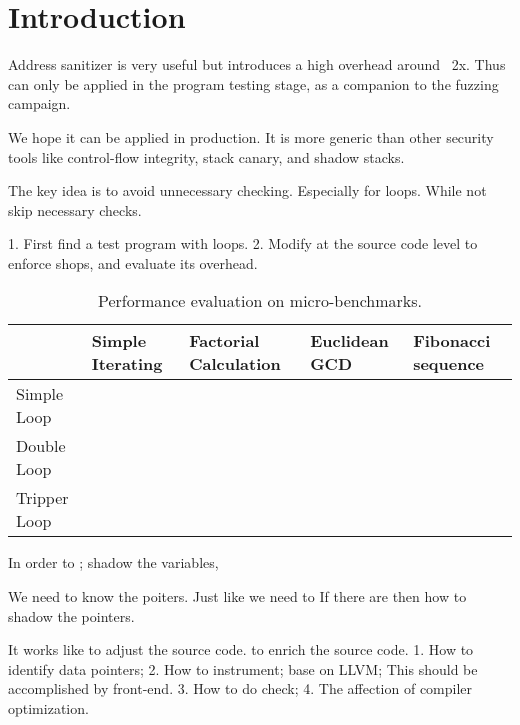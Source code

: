 \section{Introduction}

Address sanitizer is very useful but introduces a high overhead around ~2x.
Thus can only be applied in the program testing stage, as a companion to the fuzzing campaign.

We hope it can be applied in production.
It is more generic than other security tools like control-flow integrity, stack canary, and shadow stacks.


The key idea is to avoid unnecessary checking. Especially for loops.
While not skip necessary checks.

1. First find a test program with loops.
2. Modify at the source code level to enforce shops, and evaluate its overhead.


\begin{table}[tp]
    \begin{tabular}{|l|l|l|l|l|}
        \hline
                     & Simple Iterating & Factorial Calculation & Euclidean GCD & Fibonacci sequence \\ \hline
        Simple Loop  &                  &                       &               &                    \\ \hline
        Double Loop  &                  &                       &               &                    \\ \hline
        Tripper Loop &                  &                       &               &                    \\ \hline
    \end{tabular}
    \caption{Performance evaluation on micro-benchmarks.}
\end{table}

In order to ;
shadow the variables,

We need to know the poiters.
Just like
we need to
If there are
then how to shadow the pointers.


It works like to adjust the source code. to enrich the source code.
1. How to identify data pointers;
2. How to instrument; base on LLVM; This should be accomplished by front-end.
3. How to do check;
4. The affection of compiler optimization.




